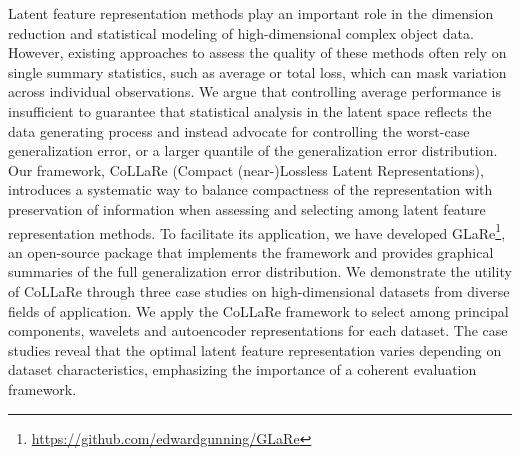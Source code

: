 

Latent feature representation methods play an important role in the dimension reduction and statistical modeling of high-dimensional complex object data.
However, existing approaches to assess the quality of these methods often rely on single summary statistics, such as average or total loss, which can mask variation across individual observations.
We argue that controlling average performance is insufficient to guarantee that statistical analysis in the latent space reflects the data generating process and instead advocate for controlling the worst-case generalization error, or a larger quantile of the generalization error distribution.
Our framework, CoLLaRe (Compact (near-)Lossless Latent Representations), introduces a systematic way to balance compactness of the representation with preservation of information when assessing and selecting among latent feature representation methods. 
To facilitate its application, we have developed GLaRe\footnote{\url{https://github.com/edwardgunning/GLaRe}}, an open-source  package that implements the framework and provides graphical summaries of the full generalization error distribution.
We demonstrate the utility of CoLLaRe through three case studies on high-dimensional datasets from diverse fields of application.
We apply the CoLLaRe framework to select among principal components, wavelets and autoencoder representations for each dataset.
The case studies reveal that the optimal latent feature representation varies depending on dataset characteristics, emphasizing the importance of a coherent evaluation framework.


